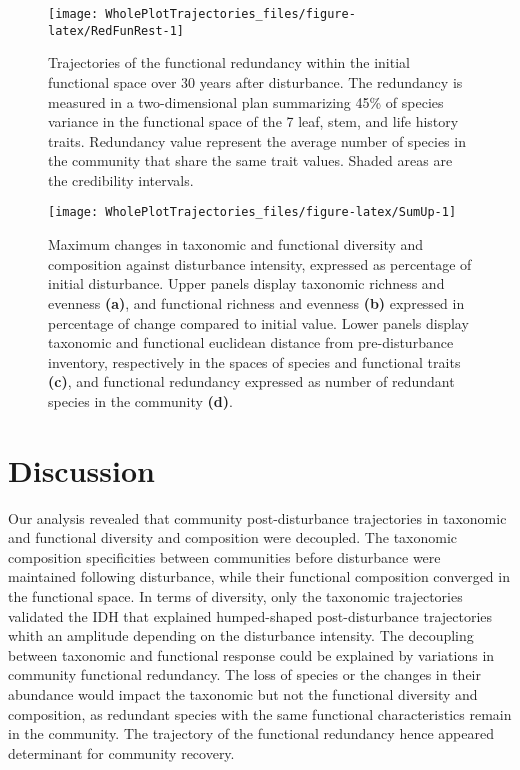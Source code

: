 \documentclass[fleqn,10pt]{ArtEcoFoG} %
\begin{document}
\begin{figure}

{\centering \texttt{[image: WholePlotTrajectories\_files/figure-latex/RedFunRest-1]} 

}

\caption{Trajectories of the functional redundancy within the initial functional space over 30 years after disturbance. The redundancy is measured in a two-dimensional plan summarizing 45\% of species variance in the functional space of the 7 leaf, stem, and life history traits. Redundancy value represent the average number of species in the community that share the same trait values. Shaded areas are the credibility intervals.}\label{fig:RedFunRest}
\end{figure}

\begin{figure}

{\centering \texttt{[image: WholePlotTrajectories\_files/figure-latex/SumUp-1]} 

}

\caption{Maximum changes in taxonomic and functional diversity and composition against disturbance intensity, expressed as percentage of initial disturbance. Upper panels display taxonomic richness and evenness \textbf{(a)}, and functional richness and evenness \textbf{(b)} expressed in percentage of change compared to initial value. Lower panels display taxonomic and functional euclidean distance from pre-disturbance inventory, respectively in the spaces of species and functional traits \textbf{(c)}, and functional redundancy expressed as number of redundant species in the community \textbf{(d)}.}\label{fig:SumUp}
\end{figure}

\hypertarget{discussion}{%
\section{Discussion}\label{discussion}}

\color{red}Our analysis revealed that community post-disturbance trajectories in taxonomic and functional diversity and composition were decoupled.
The taxonomic composition specificities between communities before disturbance were maintained following disturbance, while their functional composition converged in the functional space. \color{black}
In terms of diversity, only the taxonomic trajectories validated the IDH that explained humped-shaped post-disturbance trajectories whith an amplitude depending on the disturbance intensity.
The decoupling between taxonomic and functional response \color{red} could be \color{black}explained by variations in community functional redundancy.
\color{red}The loss of species or the changes in their abundance would impact the taxonomic but not the functional diversity and composition, as redundant species with the same functional characteristics remain in the community.
The trajectory of the functional redundancy hence appeared determinant for community recovery.\color{black}
\end{document}
